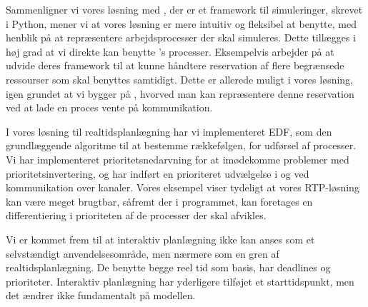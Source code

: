 Sammenligner vi vores løsning med \simpy, der er et framework til simuleringer, skrevet i Python, mener vi at vores løsning er mere intuitiv og fleksibel at benytte, med henblik på at repræsentere arbejdsprocesser der skal simuleres. Dette tillægges i høj grad at vi direkte kan benytte \pycsp's processer. Eksempelvis arbejder \simpy på at udvide deres framework til at kunne håndtere reservation af flere begrænsede ressourser som skal benyttes samtidigt. Dette er allerede muligt i vores løsning, igen grundet at vi bygger på \pycsp, hvorved man kan repræsentere denne reservation ved at lade en proces vente på kommunikation. 

I vores løsning til realtidsplanlægning har vi implementeret EDF, som den grundlæggende algoritme til at bestemme rækkefølgen, for udførsel af processer. Vi har implementeret prioritetsnedarvning for at imødekomme problemer med prioritetsinvertering, og har indført en prioriteret udvælgelse i  og ved kommunikation over kanaler. Vores eksempel viser tydeligt at vores RTP-løsning kan være meget brugtbar, såfremt der i programmet, kan foretages en differentiering i prioriteten af de processer der skal afvikles. 

Vi er kommet frem til at interaktiv planlægning ikke kan anses som et selvstændigt anvendelsesområde, men nærmere som en gren af realtidsplanlægning. De benytte begge reel tid som basis, har deadlines og prioriteter. Interaktiv planlægning har yderligere tilføjet et starttidspunkt, men det ændrer ikke fundamentalt på modellen. 










